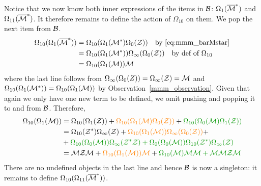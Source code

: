 \documentclass[12pt, a4paper, twoside]{report}
\begin{document}
Notice that we now know both inner expressions of the items in $\mathcal{B}$: $\Omega_1(\overline{\mathcal{M}}^*)$ and $\Omega_{11}(\overline{\mathcal{M}}^*)$. It therefore remains to define the action of $\Omega_{10}$ on them. We pop the next item from $\mathcal{B}$.
\begin{align}
  \begin{aligned}
  \Omega_{10}(\Omega_1(\overline{\mathcal{M}}^*)) &= \Omega_{10}(\Omega_1(\mathcal{M}^*)\Omega_0(\mathcal{Z}))\quad \text{by~\eqref{eq:mmm_barMstar}}\\
                                   &= \Omega_{10}(\Omega_1(\mathcal{M}^*))\Omega_\infty(\Omega_0(\mathcal{Z}))\quad \text{by def of $\Omega_{10}$}\\
                                   &= \Omega_{10}(\Omega_1(\mathcal{M}))\mathcal{M}
                                   \end{aligned}
\end{align}
where the last line follows from $\Omega_\infty(\Omega_0(Z)) = \Omega_\infty(\mathcal{Z}) = \mathcal{M}$ and $\Omega_{10}(\Omega_1(\mathcal{M}^*)) = \Omega_{10}(\Omega_1(\mathcal{M}))$ by Observation~\ref{mmm_observation}. Given that again we only have one new term to be defined, we omit pushing and popping it to and from $\mathcal{B}$. Therefore,
\begin{align}
  \begin{aligned}
    \Omega_{10}(\Omega_1(\M)) &= \Omega_{10}(\Omega_1(\Z)) + \textcolor{orange}{\Omega_{10}(\Omega_1(\M)\Omega_0(\Z))} + \textcolor{green}{\Omega_{10}(\Omega_0(\M)\Omega_1(\Z))}\\
    &= \Omega_{10}(\Zstar)\Omega_\infty(\Z) + \textcolor{orange}{\Omega_{10}(\Omega_1(\M))\Omega_\infty(\Omega_0(\Z))} +\\
    &+ \textcolor{green}{\Omega_{10}(\Omega_0(\M))\Omega_\infty(\Zstar\Z) + \Omega_0(\Omega_0(\M))\Omega_{10}(\Zstar)\Omega_\infty(\Z)}\\
    &= \M\Z\M + \textcolor{orange}{\Omega_{10}(\Omega_1(\M))\M} + \textcolor{green}{\Omega_{10}(\M)\M\M + \M\M\Z\M}
  \end{aligned}
      \label{eq:mmm_omega101M}
\end{align}
There are no undefined objects in the last line and hence $\mathcal{B}$ is now a singleton: it remains to define $\Omega_{10}(\Omega_{11}(\overline{\mathcal{M}}^*))$. 
\end{document}
